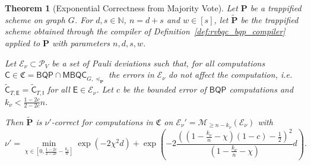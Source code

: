 \documentclass[12pt]{iopart}
\newcommand{\cptp}[1]{\mathsf{#1}} \newcommand{\pd}[1]{\mathcal{#1}}  \newcommand{\sch}[1]{\bm{#1}}
\newcommand{\Id}{\cptp{I}}
\renewcommand{\1}{\mathds{1}}
\newcommand{\Cdev}[1]{\tilde{\cptp C}_{T, #1}}
\newtheorem{theorem}{Theorem}
\begin{document}
\begin{theorem}[Exponential Correctness from Majority Vote]
\label{thm:exp-cor}
Let $\sch P$ be a trappified scheme on graph $G$. For $d, s \in \mathbb{N}$, $n = d + s$ and $w \in [s]$, let $\tilde{\sch P}$ be the trappified scheme obtained through the compiler of Definition~\ref{def:rvbqc_bqp_compiler} applied to $\sch P$ with parameters $n, d, s, w$.

Let $\mathcal{E}_\nu \subset \mathcal{P}_V$ be a set of Pauli deviations such that, for all computations $\cptp C \in \mathfrak{C} = \mathsf{BQP} \cap \mathsf{MBQC}_{G, \preceq_{\sch P}}$ the errors in $\mathcal{E}_\nu$ do not affect the computation, i.e.~$\Cdev{\cptp E} = \Cdev{\cptp \Id}$ for all $\cptp E \in \mathcal{E}_\nu$.
Let $c$ be the bounded error of $\mathsf{BQP}$ computations and $k_\nu < \frac{1 - 2c}{2 - 2c}n$.

Then $\tilde{\sch P}$ is $\nu'$-correct for computations in $\mathfrak{C}$ on $\mathcal{E}_\nu' = \mathcal{M}_{\geq n - k_\nu}(\mathcal E_\nu)$ with
\begin{equation}
\nu' = \min_{\chi \in \left[ 0, \frac{1 - 2c}{2 - 2c} - \frac{k_\nu}{n} \right]} \exp(-2\chi^2 d) + \exp(- 2\frac{\left(\left(1 - \frac{k_\nu}{n} - \chi\right)(1 - c) - \frac{1}{2}\right)^2}{\left(1 - \frac{k_\nu}{n} - \chi\right)}d).
\end{equation}
\end{theorem}
\end{document}
